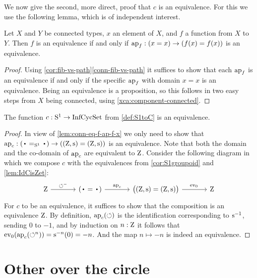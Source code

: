 We now give the second, more direct, proof that $c$ is an equivalence.
For this we use the following lemma, which is of independent interest.
\begin{lemma}\label{lem:conn-eq-f-ap-f-x}
Let $X$ and $Y$ be connected types, $x$ an element of $X$,
and $f$ a function from $X$ to $Y$. Then $f$ is an equivalence
if and only if $\ap{f}: (x=x) \to (f(x)=f(x))$ is an equivalence.
\end{lemma}
\begin{proof}
Using \cref{cor:fib-vs-path}\ref{conn-fib-vs-path} it suffices to show that
each $\ap{f}$ is an equivalence if and only if the specific $\ap{f}$ with
domain $x=x$ is an equivalence. Being an equivalence is a proposition,
so this follows in two easy steps from $X$ being connected,
using \cref{xca:component-connected}.
\end{proof}

\begin{theorem}\label{thm:S1bysymmetries}
  The function $c:{\mathrm{S}^1}\to\mathrm{InfCycSet}$ from \cref{def:S1toC} is an equivalence.
\end{theorem}
\begin{proof}
  In view of \cref{lem:conn-eq-f-ap-f-x} we only need to show that
$\ap{c}:(\base=_{\Sc}\base)\to((\zet,\zs)=(\zet,\zs))$ is an equivalence.
Note that both the domain and the co-domain of $\ap{c}$ are equivalent to $\mathrm{Z}$.
Consider the following diagram in which we compose $c$ with the equivalences
from \cref{cor:S1groupoid} and \cref{lem:IdCisZet}:
\[
  \begin{tikzcd}[column sep=large]
    \zet\ar[r,"\Sloop^-"] &
    (\base=\base)\ar[r,"\ap{c}"] &
    \bigl((\zet,\zs)=(\zet,\zs)\bigr)\ar[r,"\ev_0\vphantom{\ap{c}}"] &
    \zet
  \end{tikzcd}
\]
For $c$ to be an equivalence, it suffices to show that the composition
is an equivalence $\mathrm{Z}$.
By definition, $\ap{c}(\Sloop)$ is the identification
corresponding to $\inv\zs$, sending $0$ to $-1$,
and by induction on $n:\mathrm{Z}$ it follows that
$\ev_0(\ap{c}(\Sloop^n)) = \zs^{-n}(0) = -n$.
And the map $n \mapsto -n$ is indeed an equivalence.
\end{proof}

\section{Other \coverings over the circle}
\label{sec:covS1}

